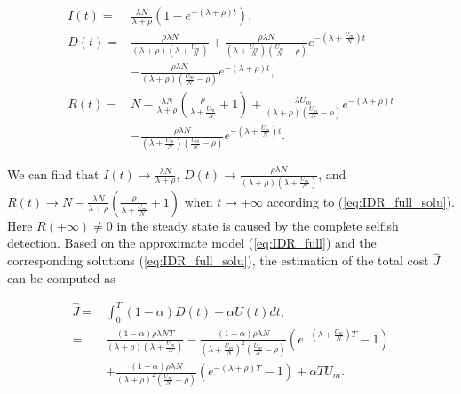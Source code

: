 \begin{small}
\begin{equation}
\label{eq:IDR_full_solu}
\begin{aligned}
I(t) =& \frac{ \lambda N }{ \lambda + \rho }(1- e^{-(\lambda + \rho)t}),\\
D(t) =& \frac{ \rho \lambda N }{ (\lambda + \rho)(\lambda + \frac{U_{m}}{N}) }
+ \frac{\rho \lambda N}{(\lambda + \frac{U_{m}}{N})(\frac{U_{m}}{N} - \rho)}
e^{-(\lambda + \frac{U_{m}}{N})t}\\
& - \frac{ \rho \lambda N }{ (\lambda + \rho)(\frac{U_{m}}{N} - \rho) }
e^{-(\lambda + \rho)t},\\
R(t) =& N - \frac{ \lambda N }{ \lambda + \rho }
\left( \frac{\rho}{\lambda + \frac{U_{m}}{N}} + 1 \right)
+ \frac{ \lambda U_{m} }{ (\lambda + \rho)(\frac{U_{m}}{N} - \rho) } e^{-(\lambda + \rho)t}\\
& - \frac{\rho \lambda N}{(\lambda + \frac{U_{m}}{N})(\frac{U_{m}}{N} - \rho)}  e^{-(\lambda + \frac{U_{m}}{N})t}.
\end{aligned}
\end{equation}
\end{small}
We can find that $I(t) \rightarrow 
\frac{ \lambda N }{ \lambda + \rho }$,
$D(t) \rightarrow \frac{ \rho \lambda N }
{ (\lambda + \rho)(\lambda + \frac{U_{m}}{N}) }$,
and $R(t) \rightarrow  
N - \frac{ \lambda N }{ \lambda + \rho } 
\left( \frac{\rho}{\lambda + \frac{U_{m}}{N}} + 1 \right)$
when $t \rightarrow +\infty$ according to (\ref{eq:IDR_full_solu}).
Here $R(+\infty) \neq 0$ in the steady state
is caused by the complete selfish detection.
Based on the approximate model (\ref{eq:IDR_full})
and the corresponding solutions (\ref{eq:IDR_full_solu}),
the estimation of the total cost $\hat{J}$
can be computed as
\begin{small}
\begin{equation}
\label{eq:IDR_full_J}
\begin{aligned}
\hat{J} =& \int_{0}^{T} (1-\alpha) D(t) + \alpha U(t) dt, \\
=& \frac{ (1-\alpha) \rho \lambda N T }{ (\lambda + \rho)(\lambda + \frac{U_{m}}{N}) }
- \frac{(1-\alpha) \rho \lambda N}{ {(\lambda + \frac{U_{m}}{N})}^{2} (\frac{U_{m}}{N} - \rho)}
(e^{-(\lambda + \frac{U_{m}}{N})T} - 1 ) \\
&+ \frac{(1-\alpha) \rho \lambda N }{ {(\lambda + \rho)}^{2} (\frac{U_{m}}{N} - \rho) }
(e^{-(\lambda + \rho)T} - 1 )
+ \alpha T U_{m}.
\end{aligned}
\end{equation}
\end{small}

